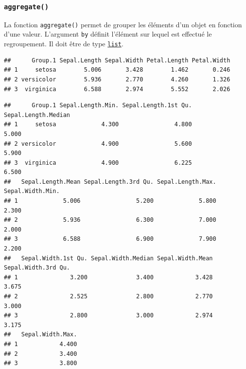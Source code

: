 \documentclass[
]{book}
\newenvironment{Shaded}{\begin{snugshade}}{\end{snugshade}}
\newcommand{\DataTypeTok}[1]{\textcolor[rgb]{0.13,0.29,0.53}{#1}}
\newcommand{\DecValTok}[1]{\textcolor[rgb]{0.00,0.00,0.81}{#1}}
\newcommand{\KeywordTok}[1]{\textcolor[rgb]{0.13,0.29,0.53}{\textbf{#1}}}
\newcommand{\NormalTok}[1]{#1}
\newcommand{\OperatorTok}[1]{\textcolor[rgb]{0.81,0.36,0.00}{\textbf{#1}}}
\begin{document}
\hypertarget{l015aggregate}{%
\subsubsection{\texorpdfstring{\texttt{aggregate()}}{aggregate()}}\label{l015aggregate}}

La fonction \texttt{aggregate()} permet de grouper les éléments d'un objet en fonction d'une valeur. L'argument \texttt{by} définit l'élément sur lequel est effectué le regroupement. Il doit être de type \protect\hyperlink{l014list}{\texttt{list}}.

\begin{Shaded}
\end{Shaded}

\begin{verbatim}
##      Group.1 Sepal.Length Sepal.Width Petal.Length Petal.Width
## 1     setosa        5.006       3.428        1.462       0.246
## 2 versicolor        5.936       2.770        4.260       1.326
## 3  virginica        6.588       2.974        5.552       2.026
\end{verbatim}

\begin{Shaded}
\end{Shaded}

\begin{verbatim}
##      Group.1 Sepal.Length.Min. Sepal.Length.1st Qu. Sepal.Length.Median
## 1     setosa             4.300                4.800               5.000
## 2 versicolor             4.900                5.600               5.900
## 3  virginica             4.900                6.225               6.500
##   Sepal.Length.Mean Sepal.Length.3rd Qu. Sepal.Length.Max. Sepal.Width.Min.
## 1             5.006                5.200             5.800            2.300
## 2             5.936                6.300             7.000            2.000
## 3             6.588                6.900             7.900            2.200
##   Sepal.Width.1st Qu. Sepal.Width.Median Sepal.Width.Mean Sepal.Width.3rd Qu.
## 1               3.200              3.400            3.428               3.675
## 2               2.525              2.800            2.770               3.000
## 3               2.800              3.000            2.974               3.175
##   Sepal.Width.Max.
## 1            4.400
## 2            3.400
## 3            3.800
\end{verbatim}
\end{document}
